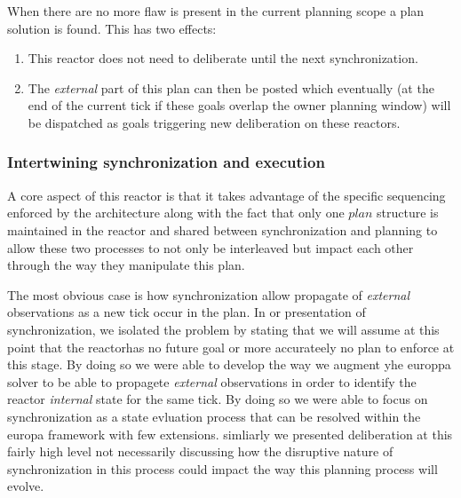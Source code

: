 When there are no more flaw is present in the current planning scope a
plan solution is found. This has two effects:

\begin{enumerate}

\item This reactor does not need to deliberate until the next synchronization.

\item The {\em external} part of this plan can then be posted which
  eventually (at the end of the current tick if these goals overlap
  the owner planning window) will be dispatched as goals triggering
  new deliberation on these reactors.

\end{enumerate}

\subsubsection{Intertwining synchronization and execution}
\label{sec:arch:intertwine}

A core aspect of this reactor is that it takes advantage of the
specific sequencing enforced by the \rx architecture along with the
fact that only one $plan$ structure is maintained in the reactor and
shared between synchronization and planning to allow these two
processes to not only be interleaved but impact each other through the
way they manipulate this plan.

The most obvious case is how synchronization allow propagate of {\em
  external} observations as a new tick occur in the plan. In or
presentation of synchronization, we isolated the problem by stating
that we will assume at this point that the reactorhas no future goal
or more accurateely no plan to enforce at this stage. By doing so we
were able to develop the way we augment yhe europpa solver to be able
to propagete {\em external} observations in order to identify the
reactor {\em internal} state for the same tick. By doing so we were
able to focus on synchronization as a state evluation process that can
be resolved within the europa framework with few extensions. simliarly
we presented deliberation at this fairly high level not necessarily
discussing how the disruptive nature of synchronization in this
process could impact the way this planning process will evolve.

